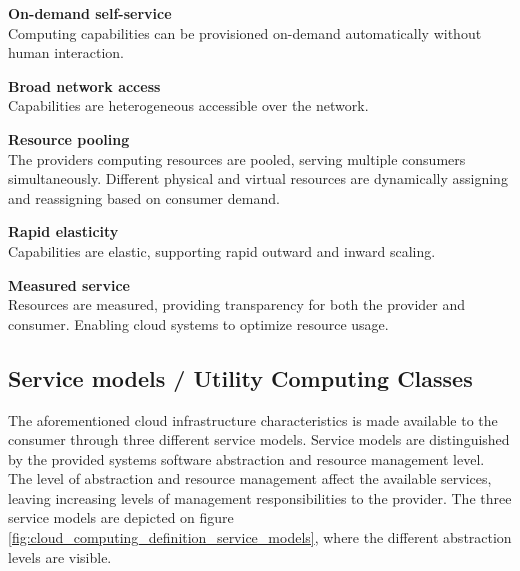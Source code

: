 \textbf{On-demand self-service}\\
Computing capabilities can be provisioned on-demand automatically without human interaction.


\textbf{Broad network access}\\
Capabilities are heterogeneous accessible over the network.


\textbf{Resource pooling}\\
The providers computing resources are pooled, serving multiple consumers simultaneously. Different physical and virtual resources are dynamically assigning and reassigning based on consumer demand.

\textbf{Rapid elasticity}\\
Capabilities are elastic, supporting rapid outward and inward scaling. 


\textbf{Measured service}\\
Resources are measured, providing transparency for both the provider and consumer. Enabling cloud systems to optimize resource usage.


\subsection{Service models / Utility Computing Classes}
The aforementioned cloud infrastructure characteristics is made available to the consumer through three different service models\cite{mell2011nist}.
Service models are distinguished by the provided systems software abstraction and resource management level. The level of abstraction and resource management affect the available services, leaving increasing levels of management responsibilities to the provider\cite[p. 52]{armbrust2010view}.
The three service models are depicted on figure \ref{fig:cloud_computing_definition_service_models}, where the different abstraction levels are visible.

